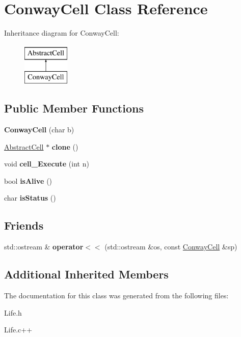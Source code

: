 \hypertarget{classConwayCell}{\section{Conway\-Cell Class Reference}
\label{classConwayCell}
}
Inheritance diagram for Conway\-Cell\-:\begin{figure}[H]
\begin{center}
\leavevmode
\includegraphics[height=2.000000cm]{classConwayCell}
\end{center}
\end{figure}
\subsection*{Public Member Functions}
\begin{DoxyCompactItemize}
\item 
\hypertarget{classConwayCell_a19d3407a2bf8febea7c97804d3f7e1c2}{{\bfseries Conway\-Cell} (char b)}\label{classConwayCell_a19d3407a2bf8febea7c97804d3f7e1c2}

\item 
\hypertarget{classConwayCell_a642f2c002fce9a1e39185f39cc5f65db}{\hyperlink{classAbstractCell}{Abstract\-Cell} $\ast$ {\bfseries clone} ()}\label{classConwayCell_a642f2c002fce9a1e39185f39cc5f65db}

\item 
\hypertarget{classConwayCell_a72890fcd4aec02ad47219914a510ecb3}{void {\bfseries cell\-\_\-\-Execute} (int n)}\label{classConwayCell_a72890fcd4aec02ad47219914a510ecb3}

\item 
\hypertarget{classConwayCell_a8431ae5417f7c05a8bf73b67c53d7140}{bool {\bfseries is\-Alive} ()}\label{classConwayCell_a8431ae5417f7c05a8bf73b67c53d7140}

\item 
\hypertarget{classConwayCell_aa6d025474d9c4b2cf8e57086989fed7e}{char {\bfseries is\-Status} ()}\label{classConwayCell_aa6d025474d9c4b2cf8e57086989fed7e}

\end{DoxyCompactItemize}
\subsection*{Friends}
\begin{DoxyCompactItemize}
\item 
\hypertarget{classConwayCell_a984780da7a7d6d3959f91581d28e340f}{std\-::ostream \& {\bfseries operator$<$$<$} (std\-::ostream \&os, const \hyperlink{classConwayCell}{Conway\-Cell} \&sp)}\label{classConwayCell_a984780da7a7d6d3959f91581d28e340f}

\end{DoxyCompactItemize}
\subsection*{Additional Inherited Members}


The documentation for this class was generated from the following files\-:\begin{DoxyCompactItemize}
\item 
Life.\-h\item 
Life.\-c++\end{DoxyCompactItemize}
